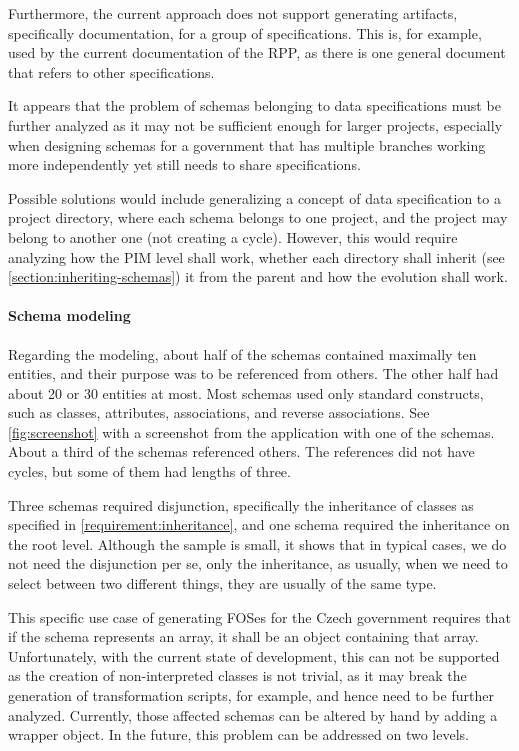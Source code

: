Furthermore, the current approach does not support generating artifacts, specifically documentation, for a group of specifications. This is, for example, used by the current documentation of the RPP, as there is one general document that refers to other specifications.

It appears that the problem of schemas belonging to data specifications must be further analyzed as it may not be sufficient enough for larger projects, especially when designing schemas for a government that has multiple branches working more independently yet still needs to share specifications.

Possible solutions would include generalizing a concept of data specification to a project directory, where each schema belongs to one project, and the project may belong to another one (not creating a cycle). However, this would require analyzing how the PIM level shall work, whether each directory shall inherit (see \autoref{section:inheriting-schemas}) it from the parent and how the evolution shall work.

\paragraph{Schema modeling} Regarding the modeling, about half of the schemas contained maximally ten entities, and their purpose was to be referenced from others. The other half had about 20 or 30 entities at most. Most schemas used only standard constructs, such as classes, attributes, associations, and reverse associations. See \autoref{fig:screenshot} with a screenshot from the application with one of the schemas. About a third of the schemas referenced others. The references did not have cycles, but some of them had lengths of three.

Three schemas required disjunction, specifically the inheritance of classes as specified in \autoref{requirement:inheritance}, and one schema required the inheritance on the root level. Although the sample is small, it shows that in typical cases, we do not need the disjunction per se, only the inheritance, as usually, when we need to select between two different things, they are usually of the same type.

\smallskip

This specific use case of generating FOSes for the Czech government requires that if the schema represents an array, it shall be an object containing that array. Unfortunately, with the current state of development, this can not be supported as the creation of non-interpreted classes is not trivial, as it may break the generation of transformation scripts, for example, and hence need to be further analyzed. Currently, those affected schemas can be altered by hand by adding a wrapper object. In the future, this problem can be addressed on two levels.

